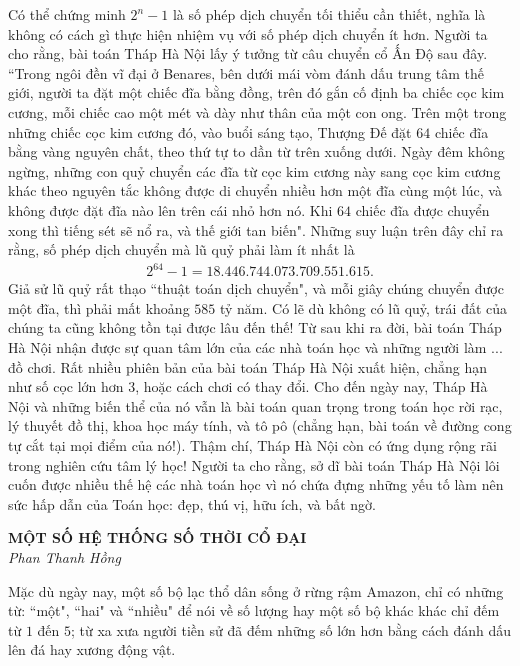 	\vskip 0.1cm
	Có thể chứng minh $2^n - 1$  là số phép dịch chuyển tối thiểu cần thiết, nghĩa là không có cách gì thực hiện nhiệm vụ với số phép dịch chuyển ít hơn.
	\vskip 0.1cm
	Người ta cho rằng, bài toán Tháp Hà Nội lấy ý tưởng từ câu chuyển cổ Ấn Độ sau đây.
	\vskip 0.1cm
	``Trong ngôi đền vĩ đại ở Benares, bên dưới mái vòm đánh dấu trung tâm thế giới, người ta đặt một chiếc đĩa bằng đồng, trên đó gắn cố định ba chiếc cọc kim cương, mỗi chiếc cao một mét và dày như thân của một con ong. Trên một trong những chiếc cọc  kim cương đó, vào buổi sáng tạo, Thượng Đế đặt $64$ chiếc đĩa bằng vàng nguyên chất, theo thứ tự to dần từ trên xuống dưới.  Ngày đêm không ngừng, những con quỷ chuyển các đĩa từ cọc kim cương này sang cọc kim cương khác theo nguyên tắc không được di chuyển nhiều hơn một đĩa cùng một lúc, và không được đặt đĩa nào lên trên cái nhỏ hơn nó. Khi $64$ chiếc  đĩa  được chuyển xong thì tiếng sét sẽ nổ ra, và thế giới tan biến".
	\vskip 0.1cm
	Những suy luận trên đây chỉ ra rằng, số phép dịch chuyển mà lũ quỷ phải làm ít nhất là
	\begin{align*}
		2^{64} - 1= 18{.}446{.}744{.}073{.}709{.}551{.}615.
	\end{align*}
	Giả sử lũ quỷ rất thạo ``thuật toán dịch chuyển", và mỗi giây chúng chuyển được một đĩa, thì phải mất khoảng $585$ tỷ năm. Có lẽ dù không có lũ quỷ, trái đất của chúng ta cũng không tồn tại được lâu đến thế!
	\vskip 0.1cm
	Từ sau khi ra đời, bài toán Tháp Hà Nội nhận được sự quan tâm lớn của các nhà toán học và những người làm ... đồ chơi. Rất nhiều phiên bản của bài toán Tháp Hà Nội xuất hiện, chẳng hạn như số cọc lớn hơn $3$, hoặc cách chơi có thay đổi. Cho đến ngày nay, Tháp Hà Nội và những biến thể của nó vẫn là bài toán quan trọng trong toán học rời rạc, lý thuyết đồ thị, khoa học máy tính, và tô pô (chẳng hạn, bài toán về đường cong tự cắt tại mọi điểm của nó!). Thậm chí, Tháp Hà Nội còn có ứng dụng rộng rãi trong nghiên cứu tâm lý học!
	\vskip 0.1cm
	Người ta cho rằng, sở dĩ bài toán Tháp Hà Nội lôi cuốn được nhiều thế hệ các nhà toán học vì nó chứa đựng những yếu tố làm nên sức hấp dẫn của Toán học: đẹp, thú vị, hữu ích, và bất ngờ.
	\newpage
		\vspace*{-30pt}
	\begin{center}
		\textbf{\color{toancuabi}\Large\color{toancuabi}MỘT SỐ HỆ THỐNG SỐ THỜI CỔ ĐẠI}\\
		\textit{Phan Thanh Hồng}
	\end{center}
	Mặc dù ngày nay, một số bộ lạc thổ dân sống ở rừng rậm Amazon, chỉ có những từ: ``một", ``hai" và ``nhiều" để nói về số lượng hay một số bộ khác khác chỉ đếm từ $1$ đến $5$; từ xa xưa người tiền sử đã đếm những số lớn hơn bằng cách đánh dấu lên đá hay xương động vật.
